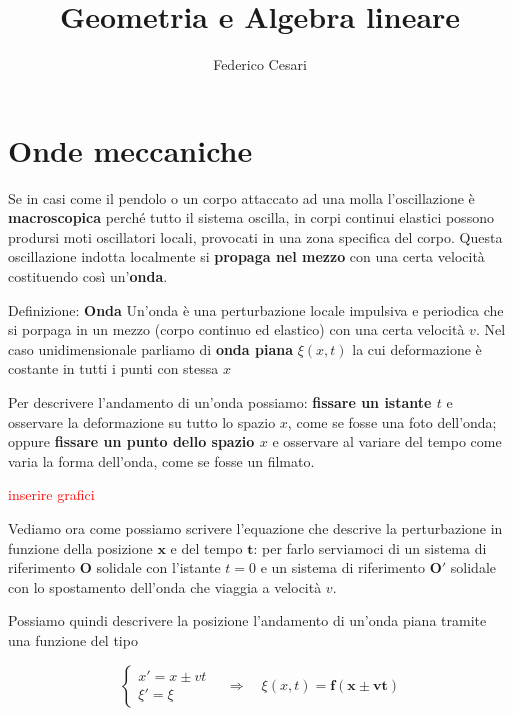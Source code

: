 \documentclass[x11names]{article}
\title{Geometria e Algebra lineare}
\author{Federico Cesari}
\date{}
\begin{document}
	

\tableofcontents
\newpage
	
\section{Onde meccaniche}
	Se in casi come il pendolo o un corpo attaccato ad una molla l'oscillazione è \textbf{macroscopica} perché tutto il sistema oscilla, in corpi continui elastici possono prodursi moti oscillatori locali, provocati in una zona specifica del corpo. Questa oscillazione indotta localmente si \textbf{propaga nel mezzo} con una certa velocità costituendo così un'\textbf{onda}.
	
	\begin{center}
		\colorbox{yblue}{\begin{minipage}{5.75in}
				\begin{blues}{Definizione: \textbf{Onda}}
					Un'onda è una perturbazione locale impulsiva e periodica che si porpaga in un mezzo (corpo continuo ed elastico) con una certa velocità \(v\). Nel caso unidimensionale parliamo di \textbf{onda piana} \(\xi(x,t)\) la cui deformazione è costante in tutti i punti con stessa \(x\)
				\end{blues}
		\end{minipage}}
	\end{center}
	
	Per descrivere l'andamento di un'onda possiamo: \textbf{fissare un istante \(t\)} e osservare la deformazione su tutto lo spazio \(x\), come se fosse una foto dell'onda; oppure \textbf{fissare un punto dello spazio \(x\)} e osservare al variare del tempo come varia la forma dell'onda, come se fosse un filmato.
	
	\begin{center}
		\textcolor{red}{inserire grafici}
	\end{center}
	
	Vediamo ora come possiamo scrivere l'equazione che descrive la perturbazione in funzione della posizione \(\mathbf{x}\) e del tempo \(\mathbf{t}\): per farlo serviamoci di un sistema di riferimento \(\mathbf{O}\) solidale con l'istante \(t=0\) e un sistema di riferimento \(\mathbf{O'}\) solidale con lo spostamento dell'onda che viaggia a velocità \(v\).
	
	Possiamo quindi descrivere la posizione l'andamento di un'onda piana tramite una funzione del tipo
	
	\[ 
	\begin{cases} 
		x' = x\pm vt \\ \xi' = \xi 
	\end{cases} 
	\quad \Rightarrow \quad \xi(x,t) = \mathbf{f(x \pm vt)}
	\]
	
\end{document}
